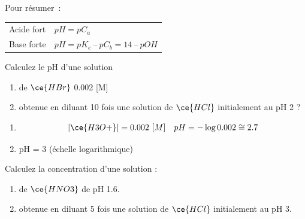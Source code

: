 \documentclass[
  11pt,
  a4paper,
  openany]{book}
\providecommand{\tightlist}{%
  \setlength{\itemsep}{0pt}\setlength{\parskip}{0pt}}
\begin{document}
Pour résumer~:

\begin{longtable}[]{@{}ll@{}}
\toprule\noalign{}
\endhead
\bottomrule\noalign{}
\endlastfoot
Acide fort & \(pH = pC_a\) \\
Base forte & \(pH = pK_e\ –\ pC_b = 14\ –\ pOH\) \\
\end{longtable}

\begin{Exercise}

Calculez le pH d'une solution

\begin{enumerate}
\def\labelenumi{\alph{enumi}.}
\tightlist
\item
  de \(\ce{HBr}\) 0.002 {[}M{]}
\item
  obtenue en diluant 10 fois une solution de \(\ce{HCl}\) initialement au pH 2 ?
\end{enumerate}

\end{Exercise}

\begin{Answer}

\begin{enumerate}
\def\labelenumi{\alph{enumi}.}
\tightlist
\item
  \[
  \begin{split}
  |\ce{H3O+}| = 0.002\ [M]
  \end{split}
  \quad
  \begin{split}
  pH = - \log 0.002 \cong 2.7
  \end{split}
  \]
\item
  pH = 3 (échelle logarithmique)
\end{enumerate}

\end{Answer}

\clearpage

\begin{Exercise}

Calculez la concentration d'une solution :

\begin{enumerate}
\def\labelenumi{\alph{enumi}.}
\tightlist
\item
  de \(\ce{HNO3}\) de pH 1.6.
\item
  obtenue en diluant 5 fois une solution de \(\ce{HCl}\) initialement au pH 3.
\end{enumerate}

\end{Exercise}
\end{document}
